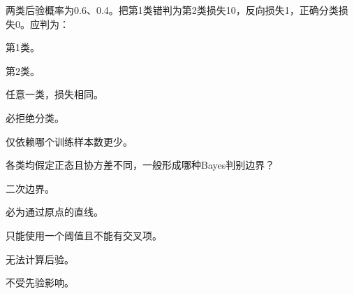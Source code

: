 \par\addvspace{6pt}\noindent\begin{minipage}{\linewidth}


两类后验概率为0.6、0.4。把第1类错判为第2类损失10，反向损失1，正确分类损失0。应判为：


\begin{choices}

\item 第1类。

\item 第2类。

\item 任意一类，损失相同。

\item 必拒绝分类。

\item 仅依赖哪个训练样本数更少。

\end{choices}

\end{minipage}\par\vspace{4pt}

\par\addvspace{6pt}\noindent\begin{minipage}{\linewidth}


各类均假定正态且协方差不同，一般形成哪种Bayes判别边界？


\begin{choices}

\item 二次边界。

\item 必为通过原点的直线。

\item 只能使用一个阈值且不能有交叉项。

\item 无法计算后验。

\item 不受先验影响。

\end{choices}

\end{minipage}\par\vspace{4pt}

